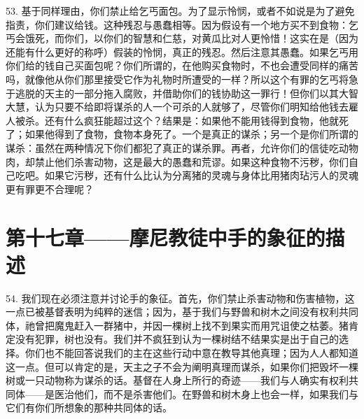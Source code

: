 53. 基于同样理由，你们禁止给乞丐面包。为了显示怜悯，或者不如说是为了避免指责，你们建议给钱。这种残忍与愚蠢相等。因为假设有一个地方买不到食物：乞丐会饿死，而你们，以你们的智慧和仁慈，对黄瓜比对人更怜惜！这实在是（因为还能有什么更好的称呼）假装的怜悯，真正的残忍。然后注意其愚蠢。如果乞丐用你们给的钱自己买面包呢？你们所谓的，在他购买食物时，不也会遭受同样的痛苦吗，就像他从你们那里接受它作为礼物时所遭受的一样？所以这个有罪的乞丐将急于逃脱的天主的一部分拖入腐败，并借助你们的钱协助这一罪行！但你们以其大智大慧，认为只要不给即将谋杀的人一个可杀的人就够了，尽管你们明知给他钱去雇人被杀。还有什么疯狂能超过这个？结果是：如果他不能用钱得到食物，他就死了；如果他得到了食物，食物本身死了。一个是真正的谋杀；另一个是你们所谓的谋杀：虽然在两种情况下你们都犯了真正的谋杀罪。再者，允许你们的信徒吃动物肉，却禁止他们杀害动物，这是最大的愚蠢和荒谬。如果这种食物不污秽，你们自己吃吧。如果它污秽，还有什么比认为分离猪的灵魂与身体比用猪肉玷污人的灵魂更有罪更不合理呢？\par


\section{第十七章——摩尼教徒中手的象征的描述}

54. 我们现在必须注意并讨论手的象征。首先，你们禁止杀害动物和伤害植物，这一点已被基督表明为纯粹的迷信；因为，基于我们与野兽和树木之间没有权利共同体，祂曾把魔鬼赶入一群猪中，并因一棵树上找不到果实而用咒诅使之枯萎。猪肯定没有犯罪，树也没有。我们并不疯狂到认为一棵树结不结果实是出于自己的选择。你们也不能回答说我们的主在这些行动中意在教导其他真理；因为人人都知道这一点。但可以肯定的是，天主之子不会为阐明真理而谋杀，如果你们把毁坏一棵树或一只动物称为谋杀的话。基督在人身上所行的奇迹——我们与人确实有权利共同体——是医治他们，而不是杀害他们。在野兽和树木身上也会一样，如果我们与它们有你们所想象的那种共同体的话。\par

